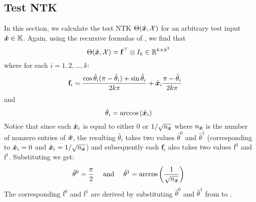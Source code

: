 \subsection{Test NTK}
In this section, we calculate the test NTK $\Theta(\hat{\boldsymbol{x}}, \mathcal{X})$ for an arbitrary test input $\hat{\boldsymbol{x}} \in \mathbb{K}$.
Again, using the recursive formulas of , we find that 
\begin{equation}
\label{eq:testntkkron}
    \Theta(\hat{\boldsymbol{x}}, \mathcal{X}) = \mathbf{f}^\top \otimes I_{k} \in \mathbb{R}^{k\times k^2}
\end{equation}
where for each $i=1,2,\dots, k$:
\begin{align}
\label{eq:vect_f}
   \mathbf{f}_i &=  \frac{\cos \hat{\theta}_i(\pi - \hat{\theta}_i) + \sin \hat{\theta}_i}{2k\pi}+ \hat{\boldsymbol{x}}_i\frac{\pi - \hat{\theta}_i}{2k\pi}
\end{align}
and 
\begin{equation}
\label{eq:theta_hat}
    \hat{\theta}_i = \arccos\left(\hat{\boldsymbol{x}}_i\right)
\end{equation}
Notice that since each $\hat{\boldsymbol{x}}_i$ is equal to either $0$ or $1/\sqrt{n_{\hat{\boldsymbol{x}}}}$ where $n_{\hat{\boldsymbol{x}}}$ is the number of nonzero entries of $\hat{\boldsymbol{x}}$, the resulting $\hat{\theta}_i$ takes two values $\hat{\theta}^0$ and $\hat{\theta}^1$ (corresponding to $\hat{\boldsymbol{x}}_i = 0$ and $\hat{\boldsymbol{x}}_i=1/\sqrt{n_{\hat{\boldsymbol{x}}}}$) and subsequently each $\mathbf{f}_i$ also takes two values $\text{f}^0$ and $\text{f}^1$. Substituting we get:  
\begin{equation}
\label{eq:binary_theta}
    \hat{\theta}^0 = \frac{\pi}{2} \quad \textrm{ and }\quad\hat{\theta}^1 = \arccos\left(\frac{1}{\sqrt{n_{\hat{\boldsymbol{x}}}}}\right)
\end{equation}
The corresponding $\mathrm{f}^0$ and $\mathrm{f}^1$ are derived by substituting $\hat{\theta}^0$ and $\hat{\theta}^1$ from  to .

